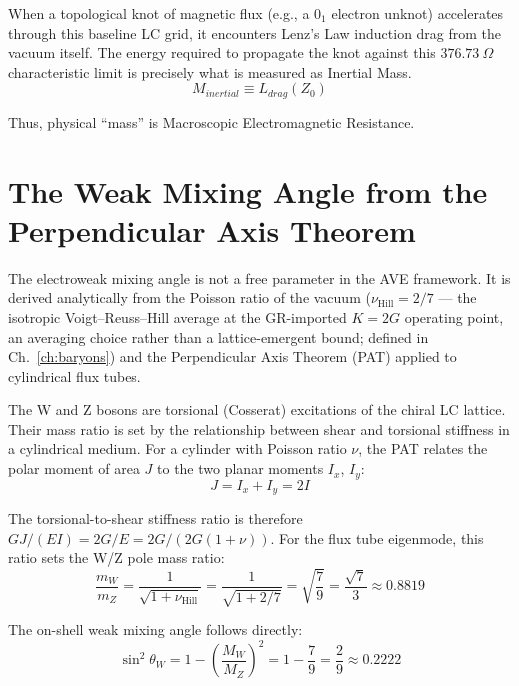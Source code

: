 When a topological knot of magnetic flux (e.g., a $0_1$ electron unknot) accelerates through this baseline LC grid, it encounters Lenz's Law induction drag from the vacuum itself. The energy required to propagate the knot against this $376.73 \ \Omega$ characteristic limit is precisely what is measured as Inertial Mass. 
\begin{equation}
    M_{inertial} \equiv L_{drag}(Z_0)
\end{equation}

Thus, physical ``mass'' is Macroscopic Electromagnetic Resistance.

\section{The Weak Mixing Angle from the Perpendicular Axis Theorem}

The electroweak mixing angle is not a free parameter in the AVE framework. It is derived analytically from the Poisson ratio of the vacuum ($\nu_{\text{Hill}} = 2/7$ --- the isotropic Voigt--Reuss--Hill average at the GR-imported $K = 2G$ operating point, an averaging choice rather than a lattice-emergent bound; defined in Ch.~\ref{ch:baryons}) and the Perpendicular Axis Theorem (PAT) applied to cylindrical flux tubes.

The W and Z bosons are torsional (Cosserat) excitations of the chiral LC lattice. Their mass ratio is set by the relationship between shear and torsional stiffness in a cylindrical medium. For a cylinder with Poisson ratio $\nu$, the PAT relates the polar moment of area $J$ to the two planar moments $I_x$, $I_y$:
\begin{equation}
    J = I_x + I_y = 2I
\end{equation}

The torsional-to-shear stiffness ratio is therefore $GJ/(EI) = 2G/E = 2G/(2G(1+\nu))$. For the flux tube eigenmode, this ratio sets the W/Z pole mass ratio:
\begin{equation}
    \frac{m_W}{m_Z} = \frac{1}{\sqrt{1 + \nu_{\text{Hill}}}} = \frac{1}{\sqrt{1 + 2/7}} = \sqrt{\frac{7}{9}} = \frac{\sqrt{7}}{3} \approx 0.8819
\end{equation}

The on-shell weak mixing angle follows directly:
\begin{equation}
    \sin^2\theta_W = 1 - \left(\frac{M_W}{M_Z}\right)^2 = 1 - \frac{7}{9} = \frac{2}{9} \approx 0.2222
\end{equation}

